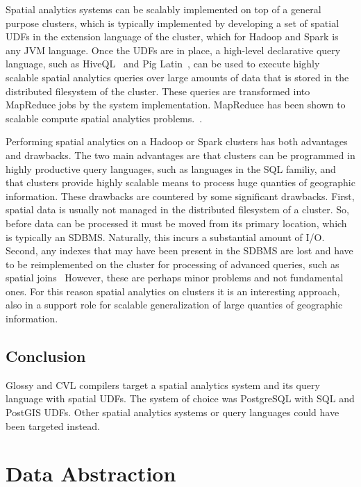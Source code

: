 \documentclass[11pt, oneside]{report}
\begin{document}
{Spatial analytics systems can be scalably implemented on top of a general purpose clusters, which is typically implemented by developing a set of spatial UDFs in the extension language of the cluster, which for Hadoop and Spark is any JVM language. Once the UDFs are in place, a high-level declarative query language, such as HiveQL~\cite{witayangkurn2012spatialhive} and Pig Latin~\cite{eldawy2014pigeon}, can be used to execute highly scalable spatial analytics queries over large amounts of data that is stored in the distributed filesystem of the cluster. These queries are transformed into MapReduce jobs by the system implementation. MapReduce has been shown to scalable compute spatial analytics problems.~\cite{cary2009experiences}.

Performing spatial analytics on a Hadoop or Spark clusters has both advantages and drawbacks. The two main advantages are that clusters can be programmed in highly productive query languages, such as languages in the SQL familiy, and that clusters provide highly scalable means to process huge quanties of geographic information. These drawbacks are countered by some significant drawbacks. First, spatial data is usually not managed in the distributed filesystem of a cluster. So, before data can be processed it must be moved from its primary location, which is typically an SDBMS. Naturally, this incurs a substantial amount of I/O. Second, any indexes that may have been present in the SDBMS are lost and have to be reimplemented on the cluster for processing of advanced queries, such as spatial joins~\cite{zhang2009sjmr} However, these are perhaps minor problems and not fundamental ones. For this reason spatial analytics on clusters it is an interesting approach, also in a support role for scalable generalization of large quanties of geographic information.

\subsection{Conclusion}

Glossy and CVL compilers target a spatial analytics system and its query language with spatial UDFs. The system of choice was PostgreSQL with SQL and PostGIS UDFs. Other spatial analytics systems or query languages could have been targeted instead.

\section{Data Abstraction}

}
\end{document}

